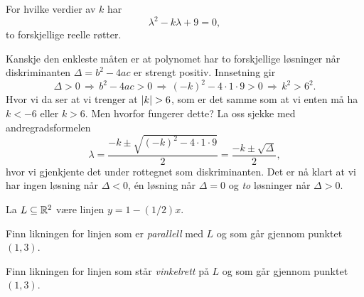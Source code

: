 \documentclass[a4paper,11pt]{article}
\begin{document}

\begin{problem}
    For hvilke verdier av $k$ har
    \begin{equation*}
        \lambda^2 - k \lambda + 9 = 0,
    \end{equation*}
    to forskjellige reelle røtter. 
\end{problem}

\begin{solution}
Kanskje den enkleste måten er at polynomet har to forskjellige løsninger
når diskriminanten $\Delta =  b^2 - 4ac$ er strengt positiv. Innsetning gir
%
\begin{equation*}
    \Delta > 0 
    \, \Rightarrow \, 
    b^2 - 4ac  > 0 
    \, \Rightarrow \, 
    (-k)^2 - 4\cdot 1 \cdot 9> 0 
    \, \Rightarrow \, 
    k^2 > 6^2.
\end{equation*}
%
Hvor vi da ser at vi trenger at $\lvert k\rvert > 6$, som er det samme som at vi 
enten må ha $k < -6$ eller $k > 6$. Men hvorfor fungerer dette? La oss sjekke 
med andregradsformelen
%
\begin{equation}
    \lambda = \frac{-k \pm \sqrt{(-k)^2 - 4\cdot 1 \cdot 9}}{2}
     = \frac{-k \pm \sqrt{\Delta}}{2},
\end{equation}
%
hvor vi gjenkjente det under rottegnet som diskriminanten. Det er nå klart at 
vi har ingen løsning når $\Delta < 0$, én løsning når $\Delta = 0$ og 
\emph{to} løsninger når $\Delta > 0$.
\end{solution}


\begin{problem} 
    La $L \subseteq \mathbb{R}^2$ være linjen $y = 1 - (1/2)x$.
    \begin{subproblem}
        \label{subproblem:MAT-0001-Exercise-03-Problem-1-x-9-a}
        Finn likningen for linjen som er \emph{parallell} med $L$ og som går 
        gjennom punktet $(1, 3)$.
    \end{subproblem}
    \begin{subproblem}
        \label{subproblem:MAT-0001-Exercise-03-Problem-1-x-9-b}
        Finn likningen for linjen som står \emph{vinkelrett} på $L$ og som går 
        gjennom punktet $(1, 3)$.
    \end{subproblem}
\end{problem}
\end{document}
